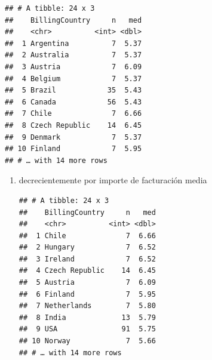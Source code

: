\documentclass[]{book}
\newenvironment{Shaded}{\begin{snugshade}}{\end{snugshade}}
\newcommand{\DataTypeTok}[1]{\textcolor[rgb]{0.13,0.29,0.53}{#1}}
\newcommand{\KeywordTok}[1]{\textcolor[rgb]{0.13,0.29,0.53}{\textbf{#1}}}
\newcommand{\NormalTok}[1]{#1}
\newcommand{\OperatorTok}[1]{\textcolor[rgb]{0.81,0.36,0.00}{\textbf{#1}}}
\newcommand{\OtherTok}[1]{\textcolor[rgb]{0.56,0.35,0.01}{#1}}
\newcommand{\StringTok}[1]{\textcolor[rgb]{0.31,0.60,0.02}{#1}}
\begin{document}
\begin{enumerate}
\begin{Shaded}
\end{Shaded}

\begin{verbatim}
## # A tibble: 24 x 3
##    BillingCountry     n   med
##    <chr>          <int> <dbl>
##  1 Argentina          7  5.37
##  2 Australia          7  5.37
##  3 Austria            7  6.09
##  4 Belgium            7  5.37
##  5 Brazil            35  5.43
##  6 Canada            56  5.43
##  7 Chile              7  6.66
##  8 Czech Republic    14  6.45
##  9 Denmark            7  5.37
## 10 Finland            7  5.95
## # … with 14 more rows
\end{verbatim}
\end{enumerate}

\begin{enumerate}
\def\labelenumi{(\alph{enumi})}
\setcounter{enumi}{1}
\item
  decrecientemente por importe de facturación media

\begin{Shaded}
\end{Shaded}

\begin{verbatim}
## # A tibble: 24 x 3
##    BillingCountry     n   med
##    <chr>          <int> <dbl>
##  1 Chile              7  6.66
##  2 Hungary            7  6.52
##  3 Ireland            7  6.52
##  4 Czech Republic    14  6.45
##  5 Austria            7  6.09
##  6 Finland            7  5.95
##  7 Netherlands        7  5.80
##  8 India             13  5.79
##  9 USA               91  5.75
## 10 Norway             7  5.66
## # … with 14 more rows
\end{verbatim}
\end{enumerate}
\end{document}
